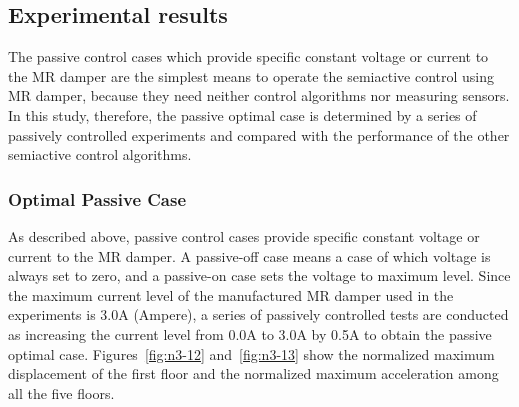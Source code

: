 
\subsection{Experimental results}
The passive control cases which provide specific constant voltage or current to the MR damper are the simplest means to operate the semiactive control using MR damper, because they need neither control algorithms nor measuring sensors. In this study, therefore, the passive optimal case is determined by a series of passively controlled experiments and compared with the performance of the other semiactive control algorithms.

\subsubsection{Optimal Passive Case}
As described above, passive control cases provide specific constant voltage or current to the MR damper. A passive-off case means a case of which voltage is always set to zero, and a passive-on case sets the voltage to maximum level. Since the maximum current level of the manufactured MR damper used in the experiments is 3.0A (Ampere), a series of passively controlled tests are conducted as increasing the current level from 0.0A to 3.0A by 0.5A to obtain the passive optimal case. Figures~\ref{fig:n3-12} and~\ref{fig:n3-13} show the normalized maximum displacement of the first floor and the normalized maximum acceleration among all the five floors. 

